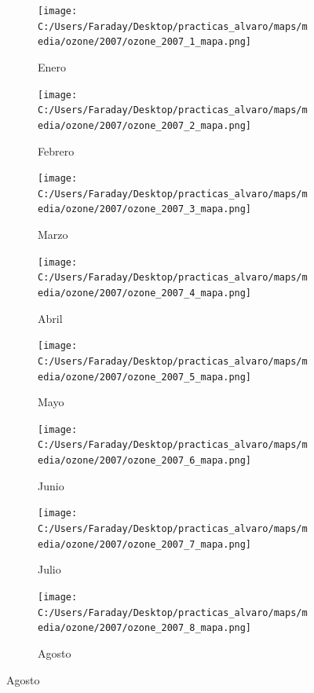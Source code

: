 \documentclass[12pt]{beamer}
\begin{document}
\begin{frame}[squeeze]
\tiny
\begin{figure}[H]
\centering
\begin{subfigure}[H]{0.20\textwidth}
\texttt{[image: C:/Users/Faraday/Desktop/practicas\_alvaro/maps/media/ozone/2007/ozone\_2007\_1\_mapa.png]}
\captionsetup{labelformat=empty}
\caption{\scriptsize Enero}
\label{fig:map-ozone-2007-1}
\end{subfigure}
%
\begin{subfigure}[H]{0.20\textwidth}
\texttt{[image: C:/Users/Faraday/Desktop/practicas\_alvaro/maps/media/ozone/2007/ozone\_2007\_2\_mapa.png]}
\captionsetup{labelformat=empty}
\caption{\scriptsize Febrero}
\label{fig:map-ozone-2007-2}
\end{subfigure}
%
\begin{subfigure}[H]{0.20\textwidth}
\texttt{[image: C:/Users/Faraday/Desktop/practicas\_alvaro/maps/media/ozone/2007/ozone\_2007\_3\_mapa.png]}
\captionsetup{labelformat=empty}
\caption{\scriptsize Marzo}
\label{fig:map-ozone-2007-3}
\end{subfigure}
%
\begin{subfigure}[H]{0.20\textwidth}
\texttt{[image: C:/Users/Faraday/Desktop/practicas\_alvaro/maps/media/ozone/2007/ozone\_2007\_4\_mapa.png]}
\captionsetup{labelformat=empty}
\caption{\scriptsize Abril}
\label{fig:map-ozone-2007-4}
\end{subfigure}

\begin{subfigure}[H]{0.20\textwidth}
\texttt{[image: C:/Users/Faraday/Desktop/practicas\_alvaro/maps/media/ozone/2007/ozone\_2007\_5\_mapa.png]}
\captionsetup{labelformat=empty}
\caption{\scriptsize Mayo}
\label{fig:map-ozone-2007-5}
\end{subfigure}
%
\begin{subfigure}[H]{0.20\textwidth}
\texttt{[image: C:/Users/Faraday/Desktop/practicas\_alvaro/maps/media/ozone/2007/ozone\_2007\_6\_mapa.png]}
\captionsetup{labelformat=empty}
\caption{\scriptsize Junio}
\label{fig:map-ozone-2007-6}
\end{subfigure}
%
\begin{subfigure}[H]{0.20\textwidth}
\texttt{[image: C:/Users/Faraday/Desktop/practicas\_alvaro/maps/media/ozone/2007/ozone\_2007\_7\_mapa.png]}
\captionsetup{labelformat=empty}
\caption{\scriptsize Julio}
\label{fig:map-ozone-2007-7}
\end{subfigure}
%
\begin{subfigure}[H]{0.20\textwidth}
\texttt{[image: C:/Users/Faraday/Desktop/practicas\_alvaro/maps/media/ozone/2007/ozone\_2007\_8\_mapa.png]}
\captionsetup{labelformat=empty}
\caption{\scriptsize Agosto}
\label{fig:map-ozone-2007-8}
\end{subfigure}


\end{figure}
\end{frame}
\end{document}
